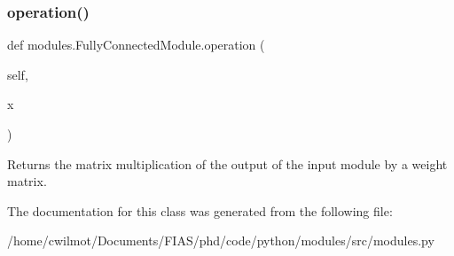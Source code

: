 \subsubsection{\texorpdfstring{operation()}{operation()}}
{\footnotesize\ttfamily def modules.\+Fully\+Connected\+Module.\+operation (\begin{DoxyParamCaption}\item[{}]{self,  }\item[{}]{x }\end{DoxyParamCaption})}



Returns the matrix multiplication of the output of the input module by a weight matrix. 



The documentation for this class was generated from the following file\+:\begin{DoxyCompactItemize}
\item 
/home/cwilmot/\+Documents/\+F\+I\+A\+S/phd/code/python/modules/src/modules.\+py\end{DoxyCompactItemize}
